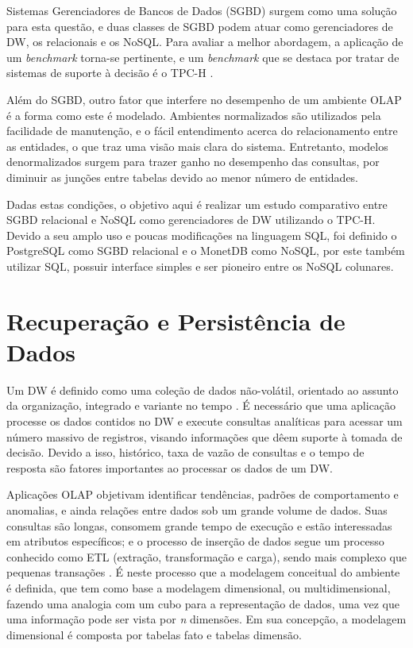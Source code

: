 \documentclass[12pt]{article}
\begin{document}
Sistemas Gerenciadores de Bancos de Dados (SGBD) surgem como uma solução 
para esta questão, e duas classes de SGBD podem atuar como gerenciadores de DW, os relacionais e os NoSQL. 
Para avaliar a melhor abordagem, a aplicação de um \textit{benchmark} torna-se pertinente, 
e um \textit{benchmark} que se destaca por tratar de sistemas de suporte à decisão é o TPC-H \cite{tpch2017page}. 

Além do SGBD, outro fator que interfere no desempenho de um ambiente OLAP é a forma como este é modelado. 
Ambientes normalizados são utilizados pela facilidade de manutenção,
e o fácil entendimento acerca do relacionamento entre as entidades, o que traz uma visão mais clara do sistema. 
Entretanto, modelos denormalizados surgem para trazer ganho no desempenho das consultas, por diminuir 
as junções entre tabelas devido ao menor número de entidades.

Dadas estas condições, o objetivo aqui é realizar um estudo comparativo entre SGBD relacional e NoSQL 
como gerenciadores de DW utilizando o TPC-H. Devido a seu amplo uso e poucas modificações na linguagem SQL, foi definido o PostgreSQL 
como SGBD relacional e o MonetDB como NoSQL, por este também utilizar SQL, possuir interface simples e ser pioneiro 
entre os NoSQL colunares.

\section{Recuperação e Persistência de Dados}

Um DW é definido como uma coleção de dados não-volátil, orientado ao assunto da organização, 
integrado e variante no tempo \cite{inmon2005building}. É necessário que uma aplicação processe os dados 
contidos no DW e execute consultas analíticas para acessar 
um número massivo de registros, visando informações que dêem suporte à tomada de decisão. Devido a isso, histórico, 
taxa de vazão de consultas e o tempo de resposta são fatores importantes ao processar os dados de um DW.

Aplicações OLAP objetivam identificar tendências, 
padrões de comportamento e anomalias, e ainda relações entre dados \cite{codd1998providing} sob um grande 
volume de dados. Suas consultas são longas, consomem grande tempo de execução e estão interessadas em 
atributos específicos; e o processo de inserção de dados segue um processo conhecido como ETL (extração, transformação e carga), 
sendo mais complexo que pequenas transações \cite{vertabelo2017olap}. É neste processo que a modelagem conceitual do ambiente é definida, 
que tem como base a modelagem dimensional, ou multidimensional, fazendo uma analogia com um cubo para 
a representação de dados, uma vez que uma informação pode ser vista por \textit{n} dimensões. 
Em sua concepção, a modelagem dimensional é composta por tabelas fato e tabelas dimensão.
\end{document}
